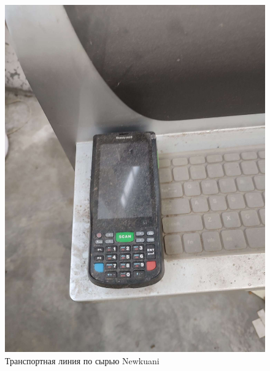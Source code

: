 \begin{figure}
\begin{center}
  \includegraphics[height=0.4\textheight, width=\textwidth, keepaspectratio]{Pics/d_Newkuani_2.JPEG}
\end{center}
  \caption{Транспортная линия по сырью Newkuani}
  \label{pic:d_Newkuani_2}
\end{figure}

